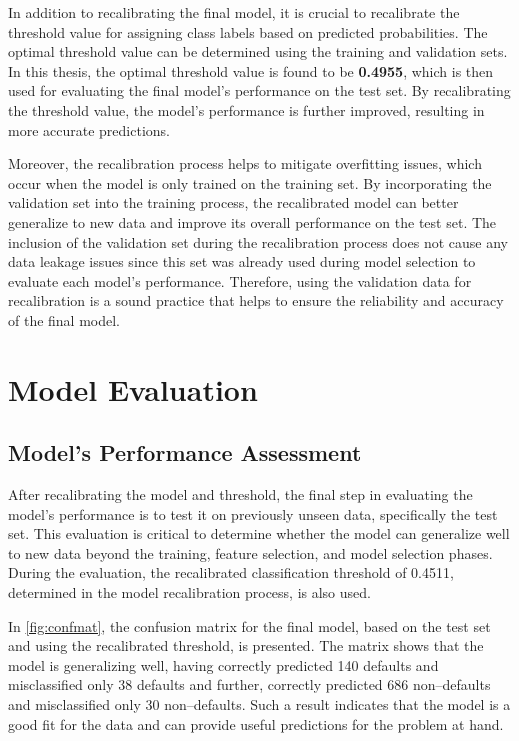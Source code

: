 In addition to recalibrating the final model, it is crucial to recalibrate the threshold value for assigning class labels based on predicted probabilities. The optimal threshold value can be determined using the training and validation sets.
In this thesis, the optimal threshold value is found to be \textbf{0.4955}, which is then used for evaluating the final model's performance on the test set.
By recalibrating the threshold value, the model's performance is further improved, resulting in more accurate predictions.

Moreover, the recalibration process helps to mitigate overfitting issues, which occur when the model is only trained on the training set.
By incorporating the validation set into the training process, the recalibrated model can better generalize to new data and improve its overall performance on the test set.
The inclusion of the validation set during the recalibration process does not cause any data leakage issues since this set was already used during model selection to evaluate each model's performance.
Therefore, using the validation data for recalibration is a sound practice that helps to ensure the reliability and accuracy of the final model.

\section{Model Evaluation}

\subsection{Model's Performance Assessment}

After recalibrating the model and threshold, the final step in evaluating the model's performance is to test it on previously unseen data, specifically the test set.
This evaluation is critical to determine whether the model can generalize well to new data beyond the training, feature selection, and model selection phases.
During the evaluation, the recalibrated classification threshold of 0.4511, determined in the model recalibration process, is also used.

In \autoref{fig:confmat}, the confusion matrix for the final model, based on the test set and using the recalibrated threshold, is presented. The matrix shows that the model is generalizing well, having correctly predicted 140 defaults and misclassified only 38 defaults and further, correctly predicted 686 non--defaults and misclassified only 30 non--defaults. Such a result indicates that the model is a good fit for the data and can provide useful predictions for the problem at hand.


